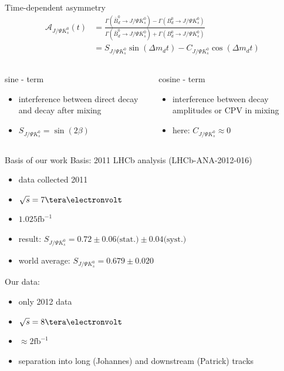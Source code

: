 \documentclass{beamer}
\newcommand{\SJPsi}{S_{J/\Psi K_s^0}}
\begin{document}
	
	\begin{frame}{Time-dependent asymmetry}
	\begin{align}
	\mathcal{A}_{J/\Psi K_s^0}(t) &= \frac{\Gamma(\bar{B}_d^0 \rightarrow J/\Psi K_s^0)-\Gamma(B_d^0 \rightarrow J/\Psi K_s^0)}{\Gamma(\bar{B}_d^0 \rightarrow J/\Psi K_s^0)+\Gamma(B_d^0 \rightarrow J/\Psi K_s^0)} \\
		&= S_{J/\Psi K_s^0}\sin(\Delta m_d t) - C_{J/\Psi K_s^0}\cos(\Delta m_d t)
	\end{align}
	\begin{columns}
	\begin{block}{sine - term}
	\begin{itemize}
		\item interference between direct decay and decay after mixing
		\item $S_{J/\Psi K_s^0} = \sin(2\beta)$
	\end{itemize}
	\end{block}
	
	\begin{block}{cosine - term}
	\begin{itemize}
		\item interference between decay amplitudes or CPV in mixing
		\item here: $C_{J/\Psi K_s^0} \approx 0$
	\end{itemize}
	\end{block}
	\end{columns}
	\end{frame}
	
	\begin{frame}{Basis of our work}
	Basis: 2011 LHCb analysis (LHCb-ANA-2012-016)
	\begin{itemize}
	    \item data collected 2011
	    \item $\sqrt{s} = 7\tera\electronvolt$
	    \item $1.025 \mathrm{fb}^{-1}$
	    \item result: $\SJPsi = 0.72 \pm 0.06 \text{(stat.)} \pm 0.04 \text{(syst.)}$
	    \item world average: $\SJPsi = 0.679 \pm 0.020$
	\end{itemize}
	
	Our data:
	\begin{itemize}
	    \item only 2012 data
	    \item $\sqrt{s} = 8\tera\electronvolt$
	    \item $\approx 2 \mathrm{fb}^{-1}$
   	    \item separation into long (Johannes) and downstream (Patrick) tracks
	\end{itemize}
	\end{frame}
\end{document}
